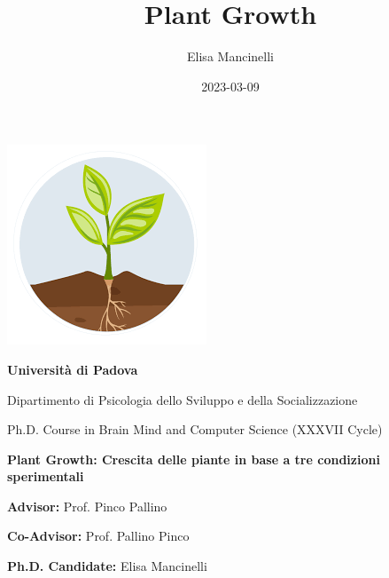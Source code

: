 \documentclass[
]{article}
\title{Plant Growth}
\author{Elisa Mancinelli}
\date{2023-03-09}
\begin{document}
\maketitle


	\begin{center}
		\includegraphics[width=0.25\linewidth]{logo/PlantLogo.png}
	\end{center}
	
	\begin{center}
		\begin{Large}
			\textbf{Università di Padova}
			
			Dipartimento di Psicologia dello Sviluppo e della Socializzazione
		\end{Large}
		
	\end{center}
	
	\vspace{3mm}
	\begin{center}
		\begin{large}
			Ph.D. Course in Brain Mind and Computer Science (XXXVII Cycle)
		\end{large}
		
		\begin{huge}
			\bfseries
			Plant Growth: Crescita delle piante in base a tre condizioni sperimentali
		\end{huge}
		
		
	\end{center}
	
	\vspace{2cm}
	\begin{multicols}{2}
		\begin{flushleft}
				\textbf{Advisor:} Prof. Pinco Pallino
				
				\textbf{Co-Advisor:} Prof. Pallino Pinco
			
		\end{flushleft}
		\columnbreak
		\begin{flushright}
			\vspace{1.5cm}
			
				\textbf{Ph.D. Candidate:} Elisa Mancinelli 
			
		\end{flushright}
		
	\end{multicols}
\end{document}
